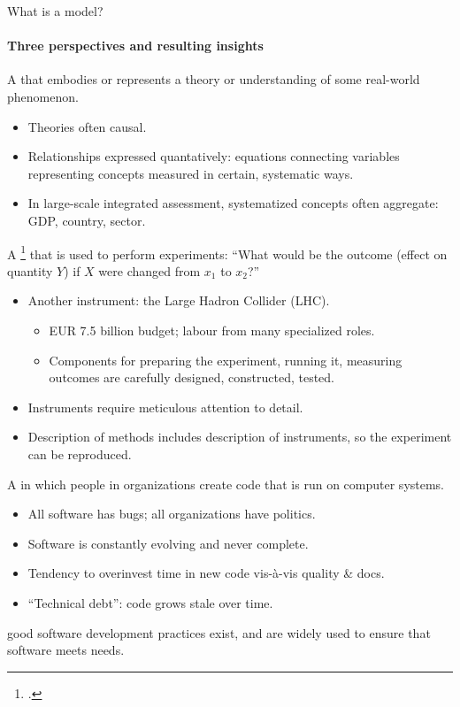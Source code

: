 \begin{frame}[allowframebreaks]{What is a model?}
\framesubtitle{Three perspectives and resulting insights}

A  that embodies or represents a theory or understanding of some real-world phenomenon.

\medskip
\begin{itemize}
  \item Theories often causal.
  \item Relationships expressed quantatively: equations connecting variables representing concepts measured in certain, systematic ways.
  \item In large-scale integrated assessment, systematized concepts often aggregate: GDP, country, sector.
\end{itemize}

\framebreak
A \footcite{omalley-2019} that is used to perform experiments: “What would be the outcome (effect on quantity $Y$) if $X$ were changed from $x_1$ to $x_2$?”

\medskip
\begin{itemize}
  \item Another instrument: the Large Hadron Collider (LHC).
    \begin{itemize}
      \item EUR 7.5 billion budget; labour from many specialized roles.
      \item Components for preparing the experiment, running it, measuring outcomes are carefully designed, constructed, tested.
    \end{itemize}
  \item Instruments require meticulous attention to detail.
  \item Description of methods includes description of instruments, so the experiment can be reproduced.
\end{itemize}

\framebreak
A  in which people in organizations create code that is run on computer systems.

\medskip
\begin{itemize}
  \item All software has bugs; all organizations have politics.
  \item Software is constantly evolving and never complete.
  \item Tendency to overinvest time in new code vis-à-vis quality \& docs.
  \item “Technical debt”: code grows stale over time.
\end{itemize}

\med
{} good software development practices exist, and are widely used to ensure that software meets needs.

\end{frame}
